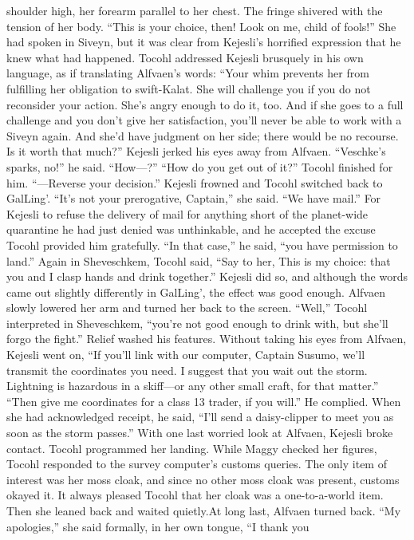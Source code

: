\documentclass[9pt]{article}
\begin{document}
shoulder high, her forearm parallel to her chest. The fringe shivered with the tension of her body. “This is
your choice, then! Look on me, child of fools!”
She had spoken in Siveyn, but it was clear from Kejesli’s horrified expression that he knew what had
happened. Tocohl addressed Kejesli brusquely in his own language, as if translating Alfvaen’s words:
“Your whim prevents her from fulfilling her obligation to swift-Kalat. She will challenge you if you do not
reconsider your action. She’s angry enough to do it, too. And if she goes to a full challenge and you don’t
give her satisfaction, you’ll never be able to work with a Siveyn again. And she’d have judgment on her
side; there would be no recourse. Is it worth that much?”
Kejesli jerked his eyes away from Alfvaen. “Veschke’s sparks, no!” he said. “How—?”
“How do you get out of it?” Tocohl finished for him. “—Reverse your decision.” Kejesli frowned and
Tocohl switched back to GalLing’. “It’s not your prerogative, Captain,” she said. “We have mail.”
For Kejesli to refuse the delivery of mail for anything short of the planet-wide quarantine he had just
denied was unthinkable, and he accepted the excuse Tocohl provided him gratefully. “In that case,” he
said, “you have permission to land.”
Again in Sheveschkem, Tocohl said, “Say to her, This is my choice: that you and I clasp hands and
drink together.” Kejesli did so, and although the words came out slightly differently in GalLing’, the effect
was good enough. Alfvaen slowly lowered her arm and turned her back to the screen.
“Well,” Tocohl interpreted in Sheveschkem, “you’re not good enough to drink with, but she’ll forgo
the fight.”
Relief washed his features. Without taking his eyes from Alfvaen, Kejesli went on, “If you’ll link with
our computer, Captain Susumo, we’ll transmit the coordinates you need. I suggest that you wait out the
storm. Lightning is hazardous in a skiff—or any other small craft, for that matter.”
“Then give me coordinates for a class 13 trader, if you will.”
He complied. When she had acknowledged receipt, he said, “I’ll send a daisy-clipper to meet you as
soon as the storm passes.” With one last worried look at Alfvaen, Kejesli broke contact.
Tocohl programmed her landing. While Maggy checked her figures, Tocohl responded to the survey
computer’s customs queries. The only item of interest was her moss cloak, and since no other moss
cloak was present, customs okayed it. It always pleased Tocohl that her cloak was a one-to-a-world
item.
Then she leaned back and waited quietly.At long last, Alfvaen turned back. “My apologies,” she said formally, in her own tongue, “I thank you
\end{document}
